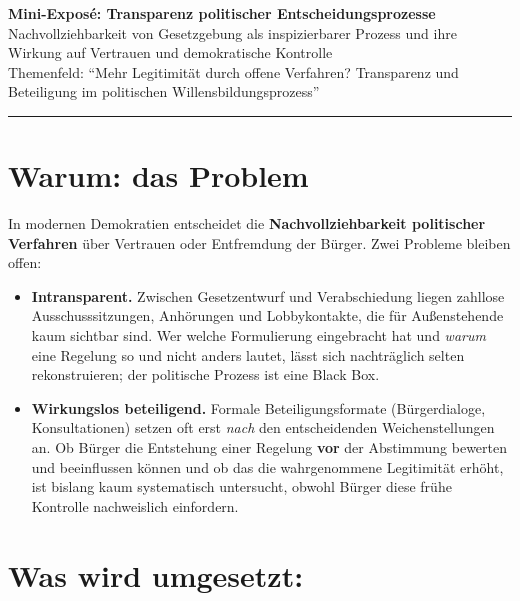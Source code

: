 \documentclass[11pt,a4paper]{scrartcl}
\begin{document}
\begin{center}
  {\Large\bfseries Mini-Exposé: Transparenz politischer Entscheidungsprozesse}\\[0.3em]
  {\small Nachvollziehbarkeit von Gesetzgebung als inspizierbarer Prozess und ihre Wirkung
  auf Vertrauen und demokratische Kontrolle \\
  Themenfeld: \enquote{Mehr Legitimität durch offene Verfahren? Transparenz und
  Beteiligung im politischen Willensbildungsprozess}}
\end{center}

\vspace{0.2em}
\hrule
\vspace{0.4em}

\section{Warum: das Problem}

In modernen Demokratien entscheidet die \textbf{Nachvollziehbarkeit politischer Verfahren}
über Vertrauen oder Entfremdung der Bürger. Zwei Probleme bleiben offen:

\begin{itemize}
  \item \textbf{Intransparent.} Zwischen Gesetzentwurf und Verabschiedung liegen zahllose
    Ausschusssitzungen, Anhörungen und Lobbykontakte, die für Außenstehende kaum sichtbar
    sind. Wer welche Formulierung eingebracht hat und \emph{warum} eine Regelung so und nicht
    anders lautet, lässt sich nachträglich selten rekonstruieren; der politische Prozess ist
    eine Black Box.
  \item \textbf{Wirkungslos beteiligend.} Formale Beteiligungsformate (Bürgerdialoge,
    Konsultationen) setzen oft erst \emph{nach} den entscheidenden Weichenstellungen an. Ob
    Bürger die Entstehung einer Regelung \textbf{vor} der Abstimmung bewerten und beeinflussen
    können und ob das die wahrgenommene Legitimität erhöht, ist bislang kaum systematisch
    untersucht, obwohl Bürger diese frühe Kontrolle nachweislich einfordern.
\end{itemize}

\section{Was wird umgesetzt:}
\end{document}
